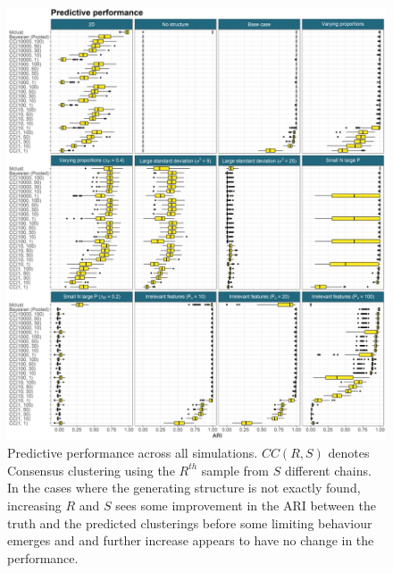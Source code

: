 \documentclass[]{article}
\begin{document}
\begin{figure} %
	\centering
	\includegraphics[scale=0.4]{./Images/Simulations/simulation_model_prediction.png}
	\caption{Predictive performance across all simulations. $CC(R, S)$ denotes Consensus clustering using the $R^{th}$ sample from $S$ different chains. In the cases where the generating structure is not exactly found, increasing $R$ and $S$ sees some improvement in the ARI between the truth and the predicted clusterings before some limiting behaviour emerges and and further increase appears to have no change in the performance.}
	\label{fig:simPrediction}
\end{figure}
\end{document}
